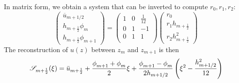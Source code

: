 In matrix form, we obtain a system that can be inverted to
compute $r_0, r_1, r_2$:
\begin{equation}
    \begin{pmatrix}
    \overline{u}_{m+1/2} \\
    h_{m+\frac{1}{2}} \phi_m \\
	    h_{m+\frac{1}{2}} \phi_{m+1}
    \end{pmatrix} = 
    \begin{pmatrix}
    1 & 0 & \frac{1}{12} \\
    0 & 1 & -1 \\
    0 & 1 & 1 \\
    \end{pmatrix}
    \begin{pmatrix}
    r_0 \\
    r_1 h_{m+\frac{1}{2}} \\
    r_2 h_{m+\frac{1}{2}}^2
    \end{pmatrix}
\end{equation}
The reconstruction of $u(z)$ between $z_m$ and $z_{m+1}$
is then
\begin{equation}
\label{eq:ND_NeutralCase_quadraticReconstruction}
{\cal S}_{m+\frac{1}{2}}(\xi) =
	\Bar{u}_{m+\frac{1}{2}} + 
	\frac{\phi_{m+1}^{} + \phi_{m}^{}}{2} \xi
	+ \frac{\phi_{m+1}^{} - \phi_{m}^{}}{2h_{m+1/2}}
	\left(\xi^2 - \frac{h_{m+1/2}^2}{12}\right)
\end{equation}

